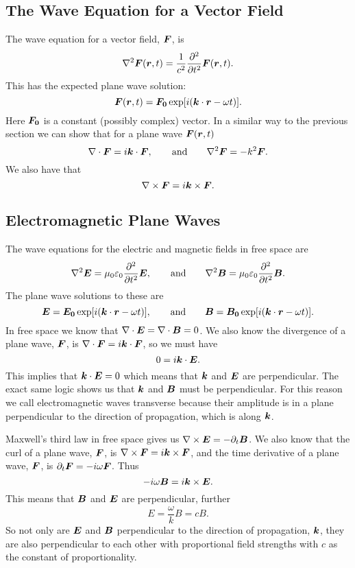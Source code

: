     \subsection{The Wave Equation for a Vector Field}
    The wave equation for a vector field, \(\bm{F}\), is
    \[\nabla^2\bm{F}(\bm{r}, t) = \frac{1}{c^2}\pdv[2]{t}\bm{F}(\bm{r}, t).\]
    This has the expected plane wave solution:
    \[\bm{F}(\bm{r}, t) = \bm{F_0}\exp[i(\bm{k}\cdot\bm{r} - \omega t)].\]
    Here \(\bm{F_0}\) is a constant (possibly complex) vector.
    In a similar way to the previous section we can show that for a plane wave \(\bm{F}(\bm{r}, t)\)
    \[\nabla\cdot\bm{F} = i\bm{k}\cdot\bm{F}, \qquad\text{and}\qquad \nabla^2\bm{F} = -k^2\bm{F}.\]
    We also have that
    \[\nabla\times\bm{F} = i\bm{k}\times\bm{F}.\]
    
    \subsection{Electromagnetic Plane Waves}
    The wave equations for the electric and magnetic fields in free space are
    \[\nabla^2\bm{E} = \mu_0\varepsilon_0\pdv[2]{t}\bm{E}, \qquad\text{and}\qquad \nabla^2\bm{B} = \mu_0\varepsilon_0 \pdv[2]{t}\bm{B}.\]
    The plane wave solutions to these are
    \[\bm{E} = \bm{E_0}\exp[i(\bm{k}\cdot\bm{r} - \omega t)], \qquad\text{and}\qquad \bm{B} = \bm{B_0}\exp[i(\bm{k}\cdot\bm{r} - \omega t)].\]
    In free space we know that \(\nabla\cdot\bm{E} = \nabla\cdot\bm{B} = 0\).
    We also know the divergence of a plane wave, \(\bm{F}\), is \(\nabla\cdot\bm{F} = i\bm{k}\cdot\bm{F}\), so we must have
    \[0 = i\bm{k}\cdot\bm{E}.\]
    This implies that \(\bm{k}\cdot\bm{E} = 0\) which means that \(\bm{k}\) and \(\bm{E}\) are perpendicular.
    The exact same logic shows us that \(\bm{k}\) and \(\bm{B}\) must be perpendicular.
    For this reason we call electromagnetic waves transverse because their amplitude is in a plane perpendicular to the direction of propagation, which is along \(\bm{k}\).
    
    Maxwell's third law in free space gives us \(\nabla\times\bm{E} = -\partial_t\bm{B}\).
    We also know that the curl of a plane wave, \(\bm{F}\), is \(\nabla\times\bm{F} = i\bm{k}\times\bm{F}\), and the time derivative of a plane wave, \(\bm{F}\), is \(\partial_t\bm{F} = -i\omega\bm{F}\).
    Thus
    \[-i\omega\bm{B} = i\bm{k}\times\bm{E}.\]
    This means that \(\bm{B}\) and \(\bm{E}\) are perpendicular, further
    \[E = \frac{\omega}{k}B = cB.\]
    So not only are \(\bm{E}\) and \(\bm{B}\) perpendicular to the direction of propagation, \(\bm{k}\), they are also perpendicular to each other with proportional field strengths with \(c\) as the constant of proportionality.
    
